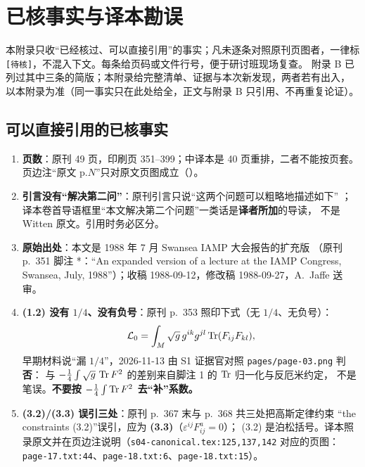 \section{已核事实与译本勘误}
\label{app:errata}

本附录只收“已经核过、可以直接引用”的事实；凡未逐条对照原刊页图者，一律标
\texttt{[待核]}，不混入下文。每条给页码或文件行号，便于研讨班现场复查。
附录 B 已列过其中三条的简版；本附录给完整清单、证据与本次新发现，两者若有出入，
以本附录为准（同一事实只在此处给全，正文与附录 B 只引用、不再重复论证）。

\subsection{可以直接引用的已核事实}

\begin{enumerate}[leftmargin=1.8em,itemsep=2pt]
\item \textbf{页数}：原刊 49 页，印刷页 351--399；中译本是 40 页重排，二者不能按页套。
      页边注“原文 p.$N$”只对原文页图成立（）。
\item \textbf{引言没有“解决第二问”}：原刊引言只说“这两个问题可以粗略地描述如下”
      ；译本卷首导语框里“本文解决第二个问题”一类话是\textbf{译者所加}的导读，
      不是 Witten 原文。引用时务必区分。
\item \textbf{原始出处}：本文是 1988 年 7 月 Swansea IAMP 大会报告的扩充版
      （原刊 p.~351 脚注 *：“An expanded version of a lecture at the IAMP Congress,
      Swansea, July, 1988”）；收稿 1988-09-12，修改稿 1988-09-27，A.~Jaffe 送审。
\item \textbf{(1.2) 没有 $1/4$、没有负号}：原刊 p.~353 照印下式（无 $1/4$、无负号）：
      \begin{equation*}
      \mathcal L_0=\int_M\sqrt g\,g^{ik}g^{jl}\operatorname{Tr}(F_{ij}F_{kl}),
      \end{equation*}
      早期材料说“漏
      $1/4$”，2026-11-13 由 S1 证据官对照 \texttt{pages/page-03.png} 判\textbf{否}：
      与 $-\frac14\int\sqrt g\,\operatorname{Tr} F^2$ 的差别来自脚注 1 的 $\operatorname{Tr}$ 归一化与反厄米约定，
      不是笔误。\textbf{不要按 $-\frac14\int\operatorname{Tr} F^2$ 去“补”系数。}
\item \textbf{(3.2)/(3.3) 误引三处}：原刊 p.~367 末与 p.~368 共三处把高斯定律约束
      “the constraints (3.2)”误引，应为 \textbf{(3.3)}（$\varepsilon^{ij}F^a_{ij}=0$）；
      (3.2) 是泊松括号。译本照录原文并在页边注说明（\texttt{s04-canonical.tex:125,137,142}
      对应的页图：\texttt{page-17.txt:44}、\texttt{page-18.txt:6}、\texttt{page-18.txt:15}）。

\end{enumerate}
